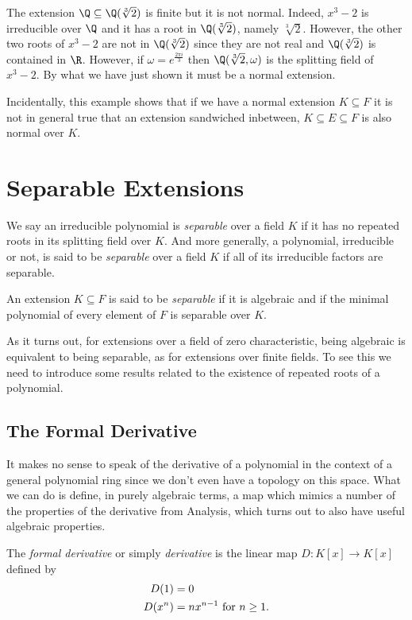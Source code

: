 \documentclass[12pt,oneside]{book}
\begin{document}
\begin{example}
	The extension \( \Q \subseteq \Q(\sqrt[3]{2}) \) is finite but it is not normal. Indeed,
	\( x^3 - 2 \) is irreducible over \( \Q \) and it has a root in \( \Q(\sqrt[3]{2}) \),
	namely \( \sqrt[3]{2} \). However, the other two roots of \( x^3 - 2 \) are not in \(
	\Q(\sqrt[3]{2}) \) since they are not real and \( \Q(\sqrt[3]{2}) \) is contained in \( \R
	\). However, if \( \omega = e^{\frac{2 \pi i}{3}} \) then \( \Q(\sqrt[3]{2}, \omega) \) is
	the splitting field of \( x^3 - 2 \). By what we have just shown it must be a normal
	extension.

	Incidentally, this example shows that if we have a normal extension \( K \subseteq F \) it
	is not in general true that an extension sandwiched inbetween, \( K \subseteq E \subseteq
	F\) is also normal over \( K \). 
\end{example}


\section{Separable Extensions}
\begin{definition}
	We say an irreducible polynomial is \emph{separable} over a field \( K \) if it has no
	repeated roots in its splitting field over \( K \). And more generally, a polynomial,
	irreducible or not, is said to be \emph{separable} over a field \( K \) if all of its
	irreducible factors are separable.
\end{definition}
\begin{definition}
	An extension \( K \subseteq F \) is said to be \emph{separable} if it is algebraic and
	if the minimal polynomial of every element of \( F \) is separable over \( K \).
\end{definition}
As it turns out, for extensions over a field of zero characteristic, being algebraic is
equivalent to being separable, as for extensions over finite fields. To see this we need
to introduce some results related to the existence of repeated roots of a polynomial.

\subsection{The Formal Derivative}
It makes no sense to speak of the derivative of a polynomial in the context of a general
polynomial ring since we don't even have a topology on this space. What we can do is
define, in purely algebraic terms, a map which mimics a number of the properties of the
derivative from Analysis, which turns out to also have useful algebraic properties. 
\begin{definition}
	The \emph{formal derivative} or simply \emph{derivative} is the linear map \( D \colon
	K[x] \to K[x] \) defined by
	\begin{align*}
		D(1) & = 0\\
		D(x^n) & = nx^{n-1} \text{ for \( n \geq 1 \)}.
	\end{align*}
\end{definition}
\end{document}
